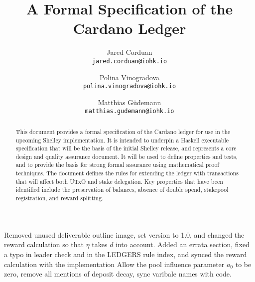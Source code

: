 
  \cleardoublepage%
  \tableofcontents%

  \listoffigures%
  \clearpage%

  \begin{changelog}
          {Removed unused deliverable outline image,
           set version to 1.0,
           and changed the reward calculation so that $\eta$
             takes $d$ into account.}
          {Added an errata section,
           fixed a typo in leader check and in the LEDGERS rule index,
           and synced the reward calculation with the implementation}
          {Allow the pool influence parameter $a_0$ to be zero,
          remove all mentions of deposit decay, sync varibale names with code.}
      \end{changelog}
      \clearpage%
\renewcommand{\thepage}{\arabic{page}}
\setcounter{page}{1}

\title{A Formal Specification of the Cardano Ledger}

\author{Jared Corduan  \\ {\small \texttt{jared.corduan@iohk.io}} \\
   \and Polina Vinogradova \\ {\small \texttt{polina.vinogradova@iohk.io}} \\
   \and Matthias G\"udemann  \\ {\small \texttt{matthias.gudemann@iohk.io}}}


\maketitle

\begin{abstract}
This document provides a formal specification of the Cardano ledger for use in the upcoming Shelley implementation.
It is intended to underpin a Haskell executable specification that will be the basis of the initial
Shelley release, and represents a core design and quality assurance document.
It will be used to define properties and tests, and to provide the basis for strong formal assurance
using mathematical proof techniques.
The document defines the rules for extending the ledger with transactions
that will affect both UTxO and stake delegation.
Key properties that have been identified include the preservation of balances, absence of double spend, stakepool registration,
and reward splitting.
\end{abstract}

